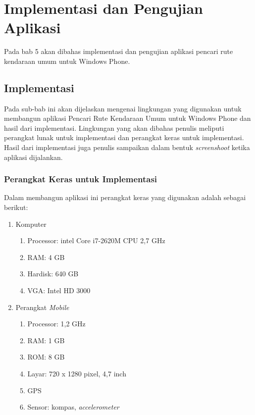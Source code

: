 \chapter{Implementasi dan Pengujian Aplikasi}
\label{chap:Implementasi dan Pengujian Aplikasi}

Pada bab 5 akan dibahas implementasi dan pengujian aplikasi pencari rute kendaraan umum untuk Windows Phone.

\section{Implementasi}
\label{lab:Implementasi}
\hspace{0.5cm} Pada sub-bab ini akan dijelaskan mengenai lingkungan yang digunakan untuk membangun aplikasi Pencari Rute Kendaraan Umum untuk Windows Phone dan hasil dari implementasi. Lingkungan yang akan dibahas penulis meliputi perangkat lunak untuk implementasi dan perangkat keras untuk implementasi. Hasil dari implementasi juga penulis sampaikan dalam bentuk \textit{screenshoot} ketika aplikasi dijalankan.

\subsection{Perangkat Keras untuk Implementasi}
\label{lab:Perangkat Keras untuk Implementasi}
\hspace{0.5cm} Dalam membangun aplikasi ini perangkat keras yang digunakan adalah sebagai berikut:
\begin{enumerate}
	\item Komputer
		\begin{enumerate}
			\item Processor: intel Core i7-2620M CPU 2,7 GHz
			\item RAM: 4 GB
			\item Hardisk: 640 GB
			\item VGA: Intel HD 3000
		\end{enumerate}
		
	\item Perangkat \textit{Mobile}
		\begin{enumerate}
			\item Processor: 1,2 GHz
			\item RAM: 1 GB
			\item ROM: 8 GB
			\item Layar: 720 x 1280 pixel, 4,7 inch
			\item GPS
			\item Sensor: kompas, \textit{accelerometer}
		\end{enumerate}
\end{enumerate}

